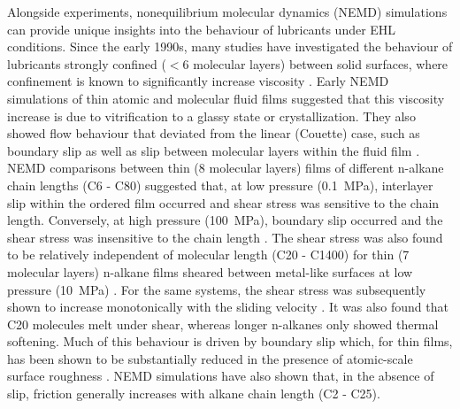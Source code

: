 \documentclass[aps,prb,reprint,superscriptaddress, a4paper]{revtex4-1}
\begin{document}
Alongside experiments, nonequilibrium molecular dynamics (NEMD) simulations can provide unique insights into the behaviour of lubricants under EHL conditions\cite{Ewen2018}. Since the early 1990s, many studies have investigated the behaviour of lubricants strongly confined ($< 6$ molecular layers) between solid surfaces, where confinement is known to significantly increase viscosity \cite{Granick1991}. Early NEMD simulations of thin atomic and molecular fluid films suggested that this viscosity increase is due to vitrification to a glassy state or crystallization\cite{Thompson1992}. They also showed flow behaviour that deviated from the linear (Couette) case, such as boundary slip as well as slip between molecular layers within the fluid film \cite{Thompson1990}. NEMD comparisons between thin (8 molecular layers) films of different n-alkane chain lengths (C6 - C80) suggested that, at low pressure (\SI{0.1}{\mega\pascal}), interlayer slip within the ordered film occurred and shear stress was sensitive to the chain length. Conversely, at high pressure (\SI{100}{\mega\pascal}), boundary slip occurred and the shear stress was insensitive to the chain length \cite{Koike1998}. The shear stress was also found to be relatively independent of molecular length (C20 - C1400) for thin (7 molecular layers) n-alkane films sheared between metal-like surfaces at low pressure (\SI{10}{\mega\pascal}) \cite{Sivebaek2008}. For the same systems, the shear stress was subsequently shown to increase monotonically with the sliding velocity \cite{Sivebaek2010}. It was also found that C20 molecules melt under shear, whereas longer n-alkanes only showed thermal softening\cite{Sivebaek2012}. Much of this behaviour is driven by boundary slip which, for thin films, has been shown to be substantially reduced in the presence of atomic-scale surface roughness \cite{Gao2000}. NEMD simulations have also shown that, in the absence of slip, friction generally increases with alkane chain length (C2 - C25)\cite{Savio2012}.
\end{document}
